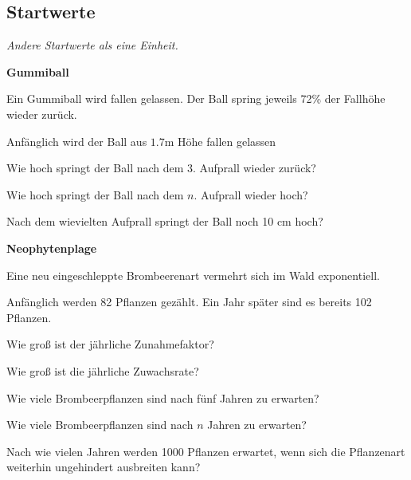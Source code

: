 \subsection{Startwerte}
\textit{Andere Startwerte als eine Einheit.}


\bbwActAufgabenNr{} \textbf{Gummiball}

Ein Gummiball wird fallen gelassen. Der Ball spring jeweils 72\% der Fallhöhe wieder zurück.

Anfänglich wird der Ball aus $1.7 \textrm{m}$ Höhe fallen gelassen

\begin{bbwAufgabenBlock}

\item Wie hoch springt der Ball nach dem 3. Aufprall wieder zurück?
\item Wie hoch springt der Ball nach dem $n$. Aufprall wieder hoch?
\item Nach dem wievielten Aufprall springt der Ball noch 10 cm hoch?
\end{bbwAufgabenBlock}
\platzFuerBerechnungenBisEndeSeite{}



\bbwActAufgabenNr{} \textbf{Neophytenplage}

Eine neu eingeschleppte Brombeerenart vermehrt sich im Wald exponentiell.

Anfänglich werden 82 Pflanzen gezählt. Ein Jahr später sind es bereits 102 Pflanzen.

\begin{bbwAufgabenBlock}

\item Wie groß ist der jährliche Zunahmefaktor?
\item Wie groß ist die jährliche Zuwachsrate?
      
\item Wie viele Brombeerpflanzen sind nach fünf Jahren zu erwarten?

\item Wie viele Brombeerpflanzen sind nach $n$ Jahren zu erwarten?
\item Nach wie vielen Jahren werden 1000 Pflanzen erwartet, wenn sich die Pflanzenart weiterhin ungehindert ausbreiten kann?
\end{bbwAufgabenBlock}
\platzFuerBerechnungenBisEndeSeite{}



